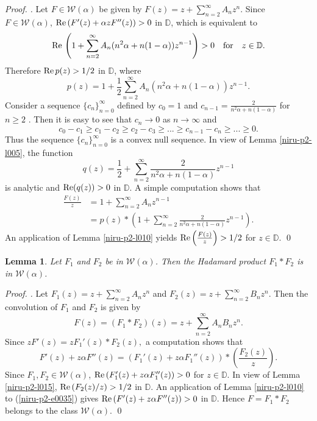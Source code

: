 \documentclass[a4paper,12pt]{amsart}
\theoremstyle{plain}
\newtheorem{lem}[equation]{Lemma}
\theoremstyle{definition}
\newenvironment{pf}[1][]{ \vskip 3mm
 \noindent
 \ifthenelse{\equal{#1}{}}  {{\slshape Proof. }}  {{\slshape #1.} } }{\qed\bigskip}
\begin{document}
\begin{pf}
 Let $F\in\mathcal{W}(\alpha)$ be given by $F(z) = z + \sum _{n = 2}^{\infty}A_n z^n.$ Since $F\in\mathcal{W}(\alpha)$, ${\rm Re\,} (F'(z) + \alpha z F''(z)) > 0$  in $\mathbb{D}$, which is equivalent to
 $$
 {\rm Re\,}\left(1 + \sum_{n=2}^{\infty}A_n(n^2 \alpha + n (1 - \alpha)) z^{n-1}\right) > 0 \quad \mbox{for} \quad z\in\mathbb{D}.
 $$
Therefore  ${\rm Re\,}p(z) > 1/2$ in $\mathbb{D}$, where
$$
p(z) = 1 + \frac{1}{2}\sum_{n=2}^{\infty}A_n(n^2 \alpha + n (1 - \alpha)) z^{n-1}.
$$
Consider a sequence $\{c_n\}_{n = 0}^{\infty}$ defined by $c_0 = 1$ and $c_{n-1} = \frac{2}{n^2\alpha + n (1 - \alpha)}$ for $n\geq 2$ . Then it is easy to see that  $c_n \rightarrow {0}$ as $n \rightarrow \infty$  and
$$
c_0 - c_1 \geq c_1 - c_2 \geq c_2 - c_3 \geq ...\geq c_{n-1} - c_n \geq ...\geq 0.
$$
Thus the sequence $\{c_n\}_{n=0}^{\infty}$ is a convex null sequence. In view of Lemma \ref{niru-p2-l005}, the function
$$
q(z) = \frac{1}{2} + \sum_{n = 2}^{\infty}\frac{2}{n^2\alpha + n (1 - \alpha)} z^{n-1}
$$
is analytic and ${\rm Re}(q(z))> 0$ in $\mathbb{D}$.
A simple computation shows that
\begin{align*}
\frac{F(z)}{z} &= 1 + \sum_{n =2}^{\infty}A_n z^{n-1}\\
& = p(z) *  \left(1 + \sum_{n = 2}^{\infty}\frac{2}{n^2\alpha + n (1 - \alpha)}z^{n-1}\right).
\end{align*}
An application of Lemma \ref{niru-p2-l010} yields ${\rm Re}\left(\frac{F(z)}{z}\right)> 1/2$ for $z\in\mathbb{D}$.
\end{pf}

\begin{lem}\label{niru-p2-l019}
Let $F_1$ and $F_2$ be in $\mathcal{W}(\alpha)$. Then the Hadamard product $F_1* F_2$ is in $\mathcal{W}(\alpha)$.
\end{lem}

\begin{pf}
Let $F_1(z) = z + \sum_{n =2}^{\infty} A_n z^n $ and $F_2(z) = z + \sum_{n =2}^{\infty} B_n z^n$.
Then the convolution of $F_1$  and $F_2$ is given by
$$
F(z) =(F_1* F_2)(z) = z + \sum_{n =2}^{\infty} A_n B_n z^n.
$$
Since
$ z F'(z) = z F_1'(z) * F_2(z),$
a computation shows that
\begin{equation}\label{niru-p2-e0035}
F'(z) + z \alpha F''(z) = (F_1'(z) + z \alpha F_1''(z) ) * \left(\frac{F_2(z)}{z} \right).
\end{equation}
Since $F_1, F_2 \in\mathcal{W}(\alpha)$, ${\rm Re\,}(F_1'(z) + z \alpha F_1''(z) ) > 0$ for $z\in\mathbb{D}$. In view of Lemma \ref{niru-p2-l015}, ${\rm Re}\left({F_2(z)}/{z} \right) > {1}/{2}$ in $\mathbb{D}$. An application of  Lemma \ref{niru-p2-l010} to (\ref{niru-p2-e0035}) gives ${\rm Re\,}(F'(z) + z \alpha F''(z) ) > 0$ in $\mathbb{D}$. Hence $F = F_1* F_2$ belongs to the class $\mathcal{W}(\alpha)$.
\end{pf}
\end{document}
